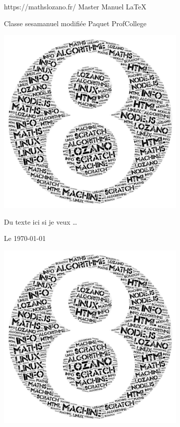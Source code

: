 \pagestyle{backCover}
\parindent=0pt
https://mathslozano.fr/  Master Manuel \LaTeX 

Classe sesamanuel modifiée Paquet ProfCollege
\begin{center}
    \includegraphics[scale=0.5]{images/8.png}%
\end{center}
\hrulefill

Du texte ici si je veux \ldots

\hrulefill
\vspace*{1cm}
\begin{center}\bfseries\Large
    \myAuthorName
\end{center}
    
\begin{flushright}
       Le \today 
\end{flushright}   
\begin{center}
    \includegraphics[scale=0.5]{images/8.png}%
\end{center}
